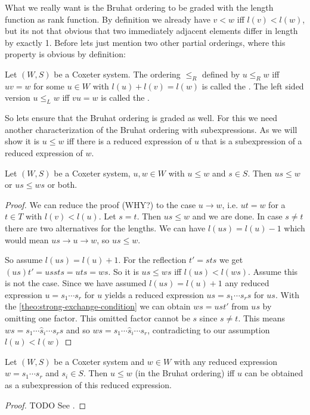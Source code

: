 What we really want is the Bruhat ordering to be graded with the length function as rank function. By definition we already have $v < w$ iff $l(v) < l(w)$, but its not that obvious that two immediately adjacent elements differ in length by exactly 1. Before lets just mention two other partial orderings, where this property is obvious by definition:

\begin{defi}
	Let $(W,S)$ be a Coxeter system. The ordering $\leq_R$ defined by $u \leq_R w$ iff $uv = w$ for some $u \in W$ with $l(u) + l(v) = l(w)$ is called the . The left sided version $u \leq_L w$ iff $vu = w$ is called the .
\end{defi}

So lets ensure that the Bruhat ordering is graded as well. For this we need another characterization of the Bruhat ordering with subexpressions. As we will show it is $u \leq w$ iff there is a reduced expression of $u$ that is a subexpression of a reduced expression of $w$.

\begin{prop}
	Let $(W,S)$ be a Coxeter system, $u,w \in W$ with $u \leq w$ and $s \in S$. Then $us \leq w$ or $us \leq ws$ or both.

	\begin{proof}
		We can reduce the proof (WHY?) to the case $u \to w$, i.e. $ut = w$ for a $t \in T$ with $l(v) < l(u)$. Let $s = t$. Then $us \leq w$ and we are done. In case $s \neq t$ there are two alternatives for the lengths. We can have $l(us) = l(u) - 1$ which would mean $us \to u \to w$, so $us \leq w$.

		So assume $l(us) = l(u) + 1$. For the reflection $t' = sts$ we get $(us)t' = ussts = uts = ws$. So it is $us \leq ws$ iff $l(us) < l(ws)$. Assume this is not the case. Since we have assumed $l(us) = l(u) + 1$ any reduced expression $u = s_1 \cdots s_r$ for $u$ yields a reduced expression $us = s_1 \cdots s_r s$ for $us$. With the \ref{theo:strong-exchange-condition} we can obtain $ws = ust'$ from $us$ by omitting one factor. This omitted factor cannot be $s$ since $s \neq t$. This means $ws = s_1 \cdots \hat s_i \cdots s_r s$ and so $ws = s_1 \cdots \hat s_i \cdots s_r$, contradicting to our assumption $l(u) < l(w)$
	\end{proof}
\end{prop}

\begin{theo}
	Let $(W,S)$ be a Coxeter system and $w \in W$ with any reduced expression $w = s_1 \cdots s_r$ and $s_i \in S$. Then $u \leq w$ (in the Bruhat ordering) iff $u$ can be obtained as a subexpression of this reduced expression.

	\begin{proof}
		TODO See \cite[Theorem 5.10]{humphreys:coxeter}.
	\end{proof}
\end{theo}

